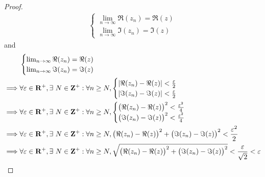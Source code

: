 \begin{proof}
\begin{align*}
\begin{cases}
                 \lim_{n \to \infty} \Re(z_n) = \Re(z) \\
                 \lim_{n \to \infty} \Im(z_n) = \Im(z)
               \end{cases}
  \end{align*}
  and
  \begin{align*}
             & \begin{cases}
                 \lim_{n \to \infty} \Re(z_n) = \Re(z) \\
                 \lim_{n \to \infty} \Im(z_n) = \Im(z)
               \end{cases}                                                                                                                                                   \\
    \implies & \forall \varepsilon \in \R^+, \exists\ N \in \Z^+ : \forall n \geq N, \begin{cases}
                                                                                       \abs{\Re(z_n) - \Re(z)} < \frac{\varepsilon}{2} \\
                                                                                       \abs{\Im(z_n) - \Im(z)} < \frac{\varepsilon}{2}
                                                                                     \end{cases}                                                                   \\
    \implies & \forall \varepsilon \in \R^+, \exists\ N \in \Z^+ : \forall n \geq N, \begin{cases}
                                                                                       \big(\Re(z_n) - \Re(z)\big)^2 < \frac{\varepsilon^2}{4} \\
                                                                                       \big(\Im(z_n) - \Im(z)\big)^2 < \frac{\varepsilon^2}{4}
                                                                                     \end{cases}                           \\
    \implies & \forall \varepsilon \in \R^+, \exists\ N \in \Z^+ : \forall n \geq N, \big(\Re(z_n) - \Re(z)\big)^2 + \big(\Im(z_n) - \Im(z)\big)^2 < \frac{\varepsilon^2}{2}                           \\
    \implies & \forall \varepsilon \in \R^+, \exists\ N \in \Z^+ : \forall n \geq N, \sqrt{\big(\Re(z_n) - \Re(z)\big)^2 + \big(\Im(z_n) - \Im(z)\big)^2} < \frac{\varepsilon}{\sqrt{2}} < \varepsilon \\

\end{align*}
\end{proof}
